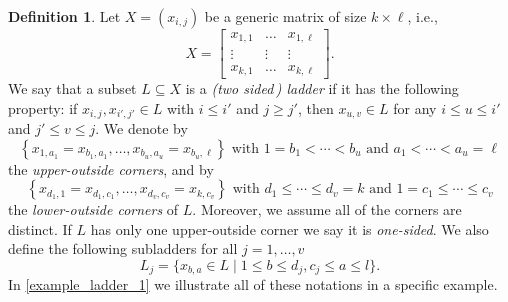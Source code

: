 \documentclass[12pt]{amsart}
\renewcommand{\leq}{\leqslant}
\renewcommand{\geq}{\geqslant}
\theoremstyle{definition}
\newtheorem{definition}[definition]{Definition}
\renewcommand{\(}{\left(}
\renewcommand{\)}{\right)}
\renewcommand{\!}[1]{{\color{red}\text{\Huge$\star$ }#1}}
\newcommand{\ls}{\leqslant}%
\begin{document}
\begin{definition}\label{def_ladder}
	Let $X=(x_{i,j})$ be a generic matrix of size $k \times \ell$,  i.e.,
	\[ X=
	\begin{bmatrix}
		x_{1,1}       & \dots  & x_{1,\ell} \\
		\vdots  & \vdots &\vdots \\
		x_{k,1}        & \dots & x_{k,\ell}
	\end{bmatrix}.
	\]%
	We say that a subset $L\subseteq X$ is a {\it {\rm (}two sided\,{\rm )} ladder} if it has
	the following property: if $x_{i,j},x_{i',j'} \in L$ with $i \leq i'$ and $j \geq j'$,  then $x_{u,v} \in L$ for any $i \leq  u \leq  i'$ and $j' \leq  v \leq  j$.  
	We denote by 
	$$\left\{x_{1,a_1}=x_{b_1,a_1},\ldots,x_{b_u,a_u}=x_{b_u,\ell}\right\} \text{ with } 1=b_1<\cdots < b_u\text{  and  } a_1<\cdots < a_u=\ell$$ 
	the {\it upper-outside corners}, and by 
	$$\left\{x_{d_1,1}=x_{d_1,c_1},\ldots,x_{d_v,c_v}=x_{k,c_v}\right\} \text{ with } d_1\ls \cdots \ls d_v=k
	\text{  and } 1=c_1\ls \cdots \ls c_v$$ the {\it lower-outside corners} of $L$.  Moreover, we assume  all of the corners are distinct. %
	If $L$ has only one upper-outside corner we say it is {\it one-sided}. 
	We also define the following subladders for all $j=1,\ldots ,v$
\begin{equation}\label{eq_Lj}
	L_j = \{x_{b,a} \in L \mid 1 \leq b \leq d_j, c_j \leq a \leq l\}.
\end{equation}
	In \autoref{example_ladder_1} we illustrate all of these notations in a specific example. 
\end{definition}
\end{document}
